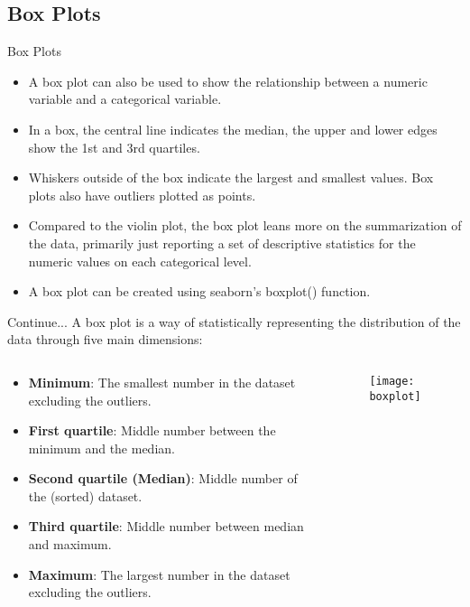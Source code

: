 \documentclass[12pt]{beamer}
\begin{document}
\subsection{Box Plots}
    \begin{frame}{Box Plots}
    	\begin{itemize}
    		\item A box plot can also be used to show the relationship between a numeric variable and a categorical variable.
    		\item  In a box, the central line indicates the median, the upper and lower edges show the 1st and 3rd quartiles. 
    		\item Whiskers outside of the box indicate the largest and smallest values. Box plots also have outliers plotted as points.
    		\item  Compared to the violin plot, the box plot leans more on the summarization of the data, primarily just reporting a set of descriptive statistics for the numeric values on each categorical level. 
    		\item A box plot can be created using seaborn's boxplot() function.
    	\end{itemize}
    \end{frame}
    \begin{frame}{Continue...}
   A box plot is a way of statistically representing the distribution of the data through five main dimensions:
    		\begin{columns}
    			\begin{column}{0.6\textwidth}
    				\begin{itemize}
    					\item \textbf{Minimum}: The smallest number in the dataset excluding the outliers.
    					\item \textbf{First quartile}: Middle number between the minimum and the median.
    					\item \textbf{Second quartile (Median)}: Middle number of the (sorted) dataset.
    					\item \textbf{Third quartile}: Middle number between median and maximum.
    					\item \textbf{Maximum}: The largest number in the dataset excluding the outliers.
    				\end{itemize}
    			\end{column}
    		    \begin{column}{0.4\textwidth}
    		    	\begin{figure}
    		    		\centering
    		    		\texttt{[image: boxplot]}
    		    	\end{figure}
    		    \end{column}
    		\end{columns}
    \end{frame}
\end{document}
